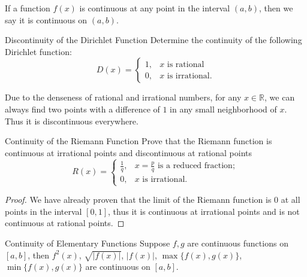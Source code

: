 \begin{note}
  If a function $f(x)$ is continuous at any point in the interval $(a, b)$,
  then we say it is continuous on $(a, b)$.
\end{note}

\begin{example}{Discontinuity of the Dirichlet Function}{}
  Determine the continuity of the following Dirichlet function:
  \begin{equation}
    D(x) =
    \begin{cases}
      1, & x \text{ is rational}\\
      0, & x \text{ is irrational}.
    \end{cases}
  \end{equation}
\end{example}

\begin{solution}
  Due to the denseness of rational and irrational numbers,
  for any $x \in \mathbb{R}$,
  we can always find two points with a difference of $1$ in any small neighborhood of
  $x$.
  Thus it is discontinuous everywhere.
\end{solution}

\begin{example}{Continuity of the Riemann Function}{}
  Prove that the Riemann function is continuous at irrational points
  and discontinuous at rational points
  \begin{equation}
    R(x) =
    \begin{cases}
      \frac{1}{q}, & x = \frac{p}{q} \text{ is a reduced fraction};\\
      0, & x \text{ is irrational}.
    \end{cases}
  \end{equation}
\end{example}

\begin{proof}
  We have already proven that the limit of the Riemann function is $0$
  at all points in the interval $[0, 1]$,
  thus it is continuous at irrational points and is not continuous at rational points.
\end{proof}

\begin{proposition}{Continuity of Elementary Functions}{}
  Suppose $f, g$ are continuous functions on $[a, b]$,
  then $f^2(x)$, $\sqrt{|f(x)|}$, $|f(x)|$, $\max\{f(x), g(x)\}$, $\min \{f(x), g(x)\}$
  are continuous on $[a, b]$.
\end{proposition}

